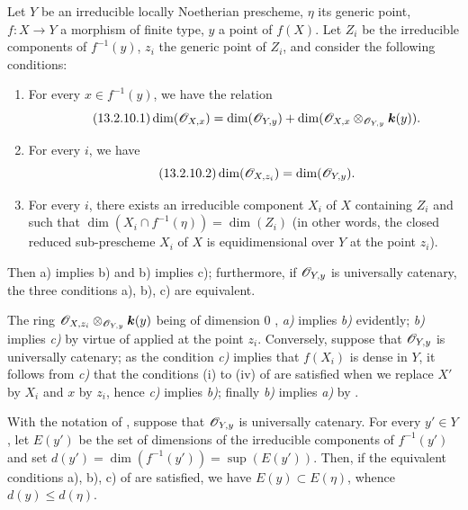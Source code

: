 \begin{proposition}[13.2.10]
\label{IV.13.2.10}
Let $Y$ be an irreducible locally Noetherian prescheme, $\eta$ its generic point, $f:X\to Y$ a morphism of finite type, $y$ a point of $f(X)$.
Let $Z_i$ be the
irreducible components of $f^{-1}(y)$, $z_i$ the generic point of $Z_i$, and consider the following conditions:
\begin{enumerate}[label=\emph{\alph*)}]
  \item For every $x\in f^{-1}(y)$, we have the relation
  \[
  \tag{13.2.10.1}
\label{IV.13.2.10.1}
    \dim(\mathscr{O}_{X,x})=\dim(\mathscr{O}_{Y,y})+\dim(\mathscr{O}_{X,x}\otimes_{\mathscr{O}_{Y,y}}\boldsymbol{k}(y)).
  \]
  \item For every $i$, we have
  \[
  \label{IV.13.2.10.2}
\tag{13.2.10.2}
    \dim(\mathscr{O}_{X,z_i})=\dim(\mathscr{O}_{Y,y}).
  \]
  \item For every $i$, there exists an irreducible component $X_i$ of $X$ containing $Z_i$ and such that $\dim(X_i\cap f^{-1}(\eta))=\dim(Z_i)$ \textup{(in other words,} the closed reduced sub-prescheme $X_i$ of $X$ is equidimensional over $Y$ at the point $z_i$).
\end{enumerate}
Then \textup{a)} implies \textup{b)} and \textup{b)} implies \textup{c)}; furthermore, if $\mathscr{O}_{Y,y}$ is universally catenary, the three conditions \textup{a), b), c)} are equivalent.
\end{proposition}

The ring $\mathscr{O}_{X,z_i}\otimes_{\mathscr{O}_{Y,y}}\boldsymbol{k}(y)$ being of dimension $0$ , \emph{a)} implies \emph{b)} evidently; \emph{b)} implies \emph{c)} by virtue of  applied at the point $z_i$.
Conversely, suppose that $\mathscr{O}_{Y,y}$ is universally catenary; as the condition \emph{c)} implies that $f(X_i)$ is dense in $Y$, it follows from \emph{c)} that the conditions (i) to (iv) of  are satisfied when we replace $X'$ by $X_i$ and $x$ by $z_i$, hence \emph{c)} implies \emph{b)}; finally \emph{b)} implies \emph{a)} by .

\begin{corollary}[13.2.11]
\label{IV.13.2.11}
With the notation of , suppose that $\mathscr{O}_{Y,y}$ is universally catenary.
For every $y'\in Y$, let $E(y')$ be the set of dimensions of the irreducible components of $f^{-1}(y')$ and set $d(y')=\dim(f^{-1}(y'))=\sup(E(y'))$.
Then, if the equivalent conditions \textup{a), b), c)} of  are satisfied, we have $E(y)\subset E(\eta)$, whence $d(y)\leq d(\eta)$.
\end{corollary}

